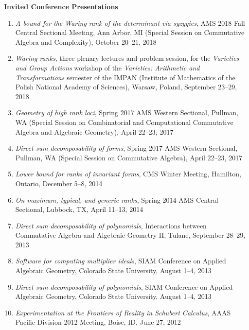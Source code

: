 \documentclass[12pt]{article}
\begin{document}
\textbf{Invited Conference Presentations}
\begin{enumerate}

\item \textit{A bound for the Waring rank of the determinant via syzygies},
AMS 2018 Fall Central Sectional Meeting, Ann Arbor, MI
(Special Session on Commutative Algebra and Complexity),
October 20--21, 2018

\item \textit{Waring ranks},
three plenary lectures and problem session,
for the \emph{Varieties and Group Actions} workshop of the \emph{Varieties: Arithmetic and Transformations}
semester of the IMPAN (Institute of Mathematics of the Polish National Academy of Sciences),
Warsaw, Poland, September 23--29, 2018

\item \textit{Geometry of high rank loci},
Spring 2017 AMS Western Sectional, Pullman, WA
(Special Session on Combinatorial and Computational Commutative Algebra and Algebraic Geometry),
April 22--23, 2017

\item \textit{Direct sum decomposability of forms},
Spring 2017 AMS Western Sectional, Pullman, WA
(Special Session on Commutative Algebra),
April 22--23, 2017

\item \textit{Lower bound for ranks of invariant forms},
CMS Winter Meeting, Hamilton, Ontario,
December 5--8, 2014

\item \textit{On maximum, typical, and generic ranks},
Spring 2014 AMS Central Sectional, Lubbock, TX,
April 11--13, 2014

\item \textit{Direct sum decomposability of polynomials},
Interactions between Commutative Algebra and Algebraic Geometry II,
Tulane,
September 28--29, 2013

\item \textit{Software for computing multiplier ideals},
SIAM Conference on Applied Algebraic Geometry,
Colorado State University,
August 1--4, 2013

\item \textit{Direct sum decomposability of polynomials},
SIAM Conference on Applied Algebraic Geometry,
Colorado State University,
August 1--4, 2013

\item \textit{Experimentation at the Frontiers of Reality in Schubert Calculus},
AAAS Pacific Division 2012 Meeting,
Boise, ID, June 27, 2012


\end{enumerate}
\end{document}
